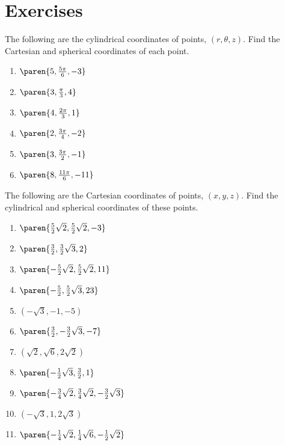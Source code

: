 \section*{Exercises}

\begin{ex} The following are the cylindrical coordinates of points, $(
r,\theta,z)$. Find the Cartesian and spherical coordinates of each point.

\begin{enumerate}
\item $\paren{5,\frac{5\pi }{6},-3} $

\item $\paren{3,\frac{\pi }{3},4} $

\item $\paren{4,\frac{2\pi }{3},1} $

\item $\paren{2,\frac{3\pi }{4},-2} $

\item $\paren{3,\frac{3\pi }{2},-1} $

\item $\paren{8,\frac{11\pi }{6},-11} $
\end{enumerate}
\end{ex}

\begin{ex} The following are the Cartesian coordinates of points, $(
x,y,z)$. Find the cylindrical and spherical coordinates of these
points.

\begin{enumerate}
\item $\paren{\frac{5}{2}\sqrt{2},\frac{5}{2}\sqrt{2},-3} $

\item $\paren{\frac{3}{2},\frac{3}{2}\sqrt{3},2} $

\item $\paren{-\frac{5}{2}\sqrt{2},\frac{5}{2}\sqrt{2},11} $

\item $\paren{-\frac{5}{2},\frac{5}{2}\sqrt{3},23} $

\item $(-\sqrt{3},-1,-5) $

\item $\paren{\frac{3}{2},-\frac{3}{2}\sqrt{3},-7} $

\item $(\sqrt{2},\sqrt{6},2\sqrt{2}) $

\item $\paren{-\frac{1}{2}\sqrt{3},\frac{3}{2},1} $

\item $\paren{-\frac{3}{4}\sqrt{2},\frac{3}{4}\sqrt{2},-\frac{3}{2}\sqrt{3}} $

\item $(-\sqrt{3},1,2\sqrt{3}) $

\item $\paren{-\frac{1}{4}\sqrt{2},\frac{1}{4}\sqrt{6},-\frac{1}{2}\sqrt{2}} $
\end{enumerate}
\end{ex}

